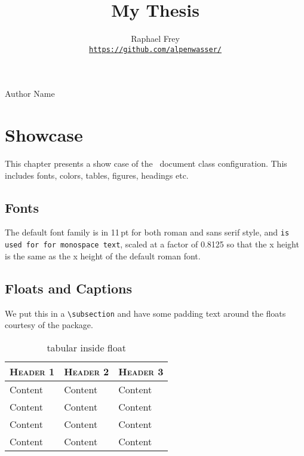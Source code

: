 \documentclass[a4paper,11pt,oneside,showtrims]{alpenthesis}
\title{My Thesis}
\author{Raphael Frey \\[1ex]\href{https://github.com/alpenwasser/}
                                 {\nolinkurl{https://github.com/alpenwasser/}}}
\begin{document}
\begin{hextitlingpage}
    \hfill{Author Name}
\end{hextitlingpage}
\frontmatter
\tableofcontents*

\mainmatter
\chapter{Showcase}

\lipsum[1-2]
This chapter presents a show case of the \athes\ document class configuration.
This includes fonts, colors, tables, figures, headings etc.

\section{Fonts}

The default  font family  is   in 11\,pt  for both  roman and
\textsf{sans serif  style}, and   \texttt{is  used for
for monospace text}, scaled at a factor of  0.8125 so that the x height is the
same as the x height of the default roman font.

\section{Floats and Captions}

We put  this in  a \verb|\subsection|  and have some  padding text  around the
floats courtesy of the  package.

\begin{table}
    \centering
    \caption{tabular inside float}
    \label{tab:float}
    \begin{tabular}{lll}
        \toprule
        \scshape Header 1 & \scshape Header 2 & \scshape Header 3 \\
        \midrule
        Content           & Content           & Content           \\
        Content           & Content           & Content           \\
        Content           & Content           & Content           \\
        Content           & Content           & Content           \\
        \bottomrule
    \end{tabular}
\end{table}
\end{document}
